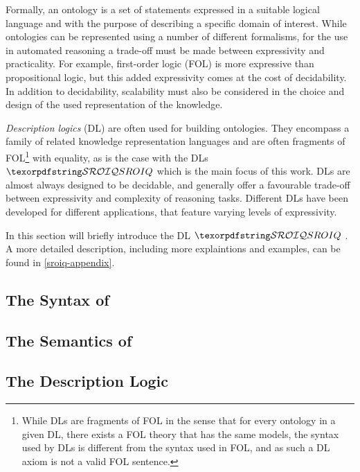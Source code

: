 Formally, an ontology is a set of statements expressed in a suitable logical language and with the purpose of describing a specific domain of interest. While ontologies can be represented using a number of different formalisms, for the use in automated reasoning a trade-off must be made between expressivity and practicality. For example, first-order logic (FOL) is more expressive than propositional logic, but this added expressivity comes at the cost of decidability. In addition to decidability, scalability must also be considered in the choice and design of the used representation of the knowledge.

\emph{Description logics} (DL) are often used for building ontologies. They encompass a family of related knowledge representation languages and are often fragments of FOL\footnote{While DLs are fragments of FOL in the sense that for every ontology in a given DL, there exists a FOL theory that has the same models, the syntax used by DLs is different from the syntax used in FOL, and as such a DL axiom is not a valid FOL sentence.} with equality, as is the case with the DLs $\SROIQ$ which is the main focus of this work. DLs are almost always designed to be decidable, and generally offer a favourable trade-off between expressivity and complexity of reasoning tasks. Different DLs have been developed for different applications, that feature varying levels of expressivity.

In this section will briefly introduce the DL $\SROIQ$ \cite{horrocks2006even, rudolph2011foundations, baader_horrocks_lutz_sattler_2017}. A more detailed description, including more explaintions and examples, can be found in \cref{sroiq-appendix}.

\subsection{The Syntax of \SROIQ} \label{sroiq-syntax}


\subsection{The Semantics of \SROIQ} \label{sroiq-semantics}


\subsection{The \ALC Description Logic}

